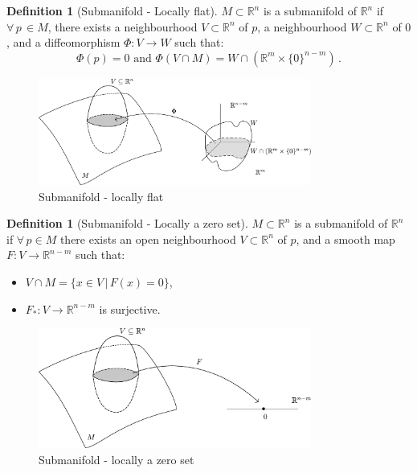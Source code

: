 \documentclass[a4paper,11pt,titlepage, article, oneside]{memoir}
\numberwithin{equation}{section}
\theoremstyle{definition}
\newtheorem{definition}[theorem]{Definition}
\theoremstyle{remark}
\newcommand{\rfield}{\mathbb{R}}
\begin{document}
\begin{definition}[Submanifold - Locally flat] \label{sub2}
  $M \subset \rfield^n$ is a submanifold of $\rfield^n$ if $\forall \, p  \,\in M$, there exists a neighbourhood $V \subset \rfield^n$ of $p$, a neighbourhood $W \subset \rfield^n$ of $0$, and a diffeomorphism $\Phi \colon V \rightarrow W$ such that:
  \[ \Phi(p)=0 \text{  and  } \Phi(V \cap M) = W \cap \left( \rfield^m \times \{0\}^{n-m} \right) \, .\]
  \begin{figure}[H]
  \label{Fig:submanifold2}
     \centering
     \includegraphics[width=0.8\textwidth]{Images/submanifold2.pdf}
     \caption{Submanifold - locally flat}
\end{figure}
\end{definition}

\begin{definition}[Submanifold - Locally  a zero set] \label{sub3}
$M \subset \rfield^n$ is a submanifold of $\rfield^n$ if
$\forall \, p \in M$ there exists an open neighbourhood $V \subset \rfield^n$ of $p$, and a smooth map $F \colon V \rightarrow \rfield^{n-m}$ such that:
\begin{itemize}
\item $V \cap M = \{x \in V \, | \, F(x) = 0\}$,
\item $F_* \colon V \rightarrow \rfield^{n-m}$ is surjective.
\end{itemize}

\begin{figure}[H]
  \label{Fig:submanifold3}
     \centering
     \includegraphics[width=0.8\textwidth]{Images/submanifold3.pdf}
     \caption{Submanifold - locally a zero set}
\end{figure}
\end{definition}
\end{document}
